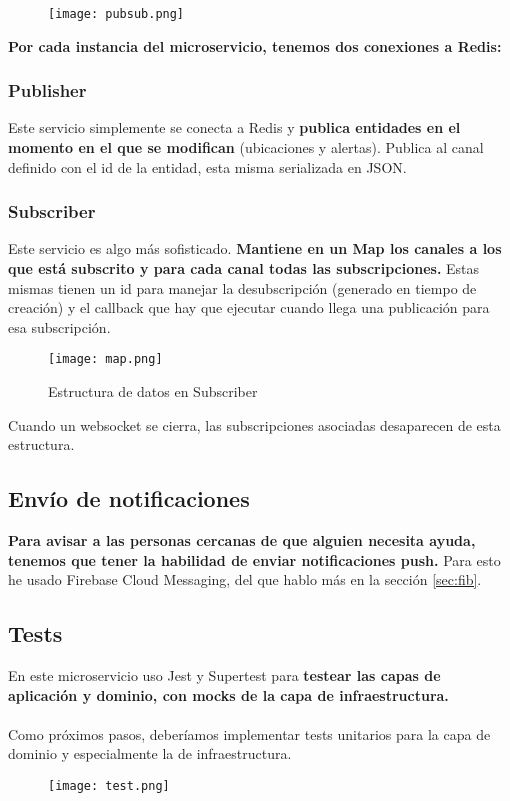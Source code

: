 \begin{figure}[H]
	\centering	
	\texttt{[image: pubsub.png]}
	\end{figure}

\textbf{Por cada instancia del microservicio, tenemos dos conexiones a Redis:}
\subsubsection{Publisher}

Este servicio simplemente se conecta a Redis y \textbf{publica entidades en el momento en el que se modifican} (ubicaciones y alertas).
Publica al canal definido con el id de la entidad, esta misma serializada en JSON.

\subsubsection{Subscriber}
Este servicio es algo más sofisticado. \textbf{Mantiene en un Map los canales a los que está subscrito y 
para cada canal todas las subscripciones.} Estas mismas tienen un id para manejar la desubscripción (generado en tiempo de creación) y 
el callback que hay que ejecutar cuando llega una publicación para esa subscripción. 
\begin{figure}[H]
	\centering	
	\texttt{[image: map.png]}
	\caption{Estructura de datos en Subscriber}
	\end{figure}
Cuando un websocket se cierra, las subscripciones asociadas desaparecen de esta estructura.
\subsection{Envío de notificaciones}\label{sec:fibpre}
\textbf{Para avisar a las personas cercanas de que alguien necesita ayuda, tenemos que tener la habilidad de enviar
notificaciones push.} Para esto he usado Firebase Cloud Messaging, del que hablo más en la sección \ref{sec:fib}.

\subsection{Tests}\label{sec:tests}
En este microservicio uso Jest y Supertest \cite{supertest} para \textbf{testear las capas de aplicación y dominio, con mocks de la capa de infraestructura.} \\ \\
Como próximos pasos, deberíamos implementar tests unitarios para la capa de dominio y especialmente la de infraestructura.
\begin{figure}[H]
	\centering	
	\texttt{[image: test.png]}
	\end{figure}

